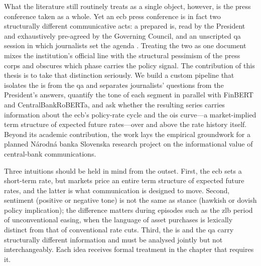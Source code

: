 What the literature still routinely treats as a single object, however, is the press conference taken as a whole. Yet an \gls{ecb} press conference is in fact two structurally different communicative acts: a prepared \gls{is}, read by the President and exhaustively pre-agreed by the Governing Council, and an unscripted \gls{qa} session in which journalists set the agenda \cite{ECB_WP2742}. Treating the two as one document mixes the institution's official line with the structural pessimism of the press corps and obscures which phase carries the policy signal. The contribution of this thesis is to take that distinction seriously. We build a custom pipeline that isolates the \gls{is} from the \gls{qa} and separates journalists' questions from the President's answers, quantify the tone of each segment in parallel with FinBERT and CentralBankRoBERTa, and ask whether the resulting series carries information about the \gls{ecb}'s policy-rate cycle and the \gls{ois} curve---a market-implied term structure of expected future rates---over and above the rate history itself. Beyond its academic contribution, the work lays the empirical groundwork for a planned Národná banka Slovenska research project on the informational value of central-bank communications.

Three intuitions should be held in mind from the outset. First, the \gls{ecb} sets a short-term rate, but markets price an entire term structure of expected future rates, and the latter is what communication is designed to move. Second, sentiment (positive or negative tone) is not the same as stance (hawkish or dovish policy implication); the difference matters during episodes such as the \gls{zlb} period of unconventional easing, when the language of asset purchases is lexically distinct from that of conventional rate cuts. Third, the \gls{is} and the \gls{qa} carry structurally different information and must be analysed jointly but not interchangeably. Each idea receives formal treatment in the chapter that requires it.

